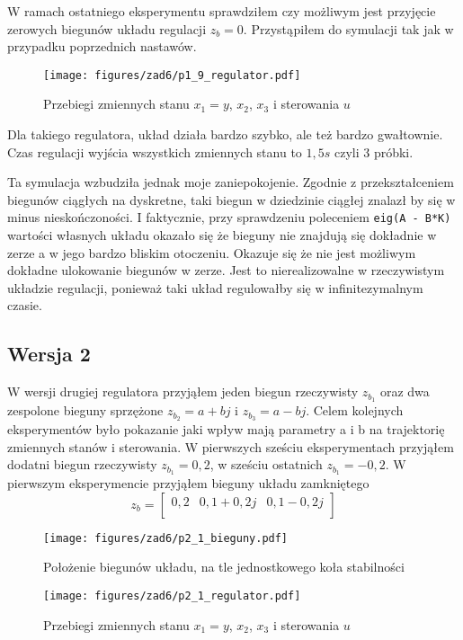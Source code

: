 \documentclass[a4paper,titlepage,11pt,floatssmall]{mwrep}
\begin{document}
W ramach ostatniego eksperymentu sprawdziłem czy możliwym jest przyjęcie zerowych biegunów układu regulacji $z_b = 0$.
Przystąpiłem do symulacji tak jak w przypadku poprzednich nastawów.

\begin{figure}[H]
\centering
\texttt{[image: figures/zad6/p1\_9\_regulator.pdf]}
\caption{Przebiegi zmiennych stanu $x_1 = y$, $x_2$, $x_3$ i sterowania $u$}
\end{figure}

\indent Dla takiego regulatora, układ działa bardzo szybko, ale też bardzo gwałtownie. Czas regulacji wyjścia wszystkich zmiennych stanu to $1,5s$ czyli 3 próbki.

\indent Ta symulacja wzbudziła jednak moje zaniepokojenie. Zgodnie z przekształceniem biegunów ciągłych na dyskretne, taki biegun w dziedzinie ciągłej znalazł by się w minus nieskończoności. I faktycznie, przy sprawdzeniu poleceniem \texttt{eig(A - B*K)} wartości własnych układu okazało się że bieguny nie znajdują się dokładnie w zerze a w jego bardzo bliskim otoczeniu. Okazuje się że nie jest możliwym dokładne ulokowanie biegunów w zerze. Jest to nierealizowalne w rzeczywistym układzie regulacji, ponieważ taki układ regulowałby się w infinitezymalnym czasie.

\subsection{Wersja 2}
W wersji drugiej regulatora przyjąłem jeden biegun rzeczywisty $z_{b_1}$ oraz dwa zespolone bieguny sprzężone $z_{b_2} = a + bj$ i $z_{b_3} = a - bj$. Celem kolejnych eksperymentów było pokazanie jaki wpływ mają parametry a i b na trajektorię zmiennych stanów i sterowania. W pierwszych sześciu eksperymentach przyjąłem dodatni biegun rzeczywisty $z_{b_1} = 0,2$, w sześciu ostatnich $z_{b_1} = -0,2$.
\newpage
\indent W pierwszym eksperymencie przyjąłem bieguny układu zamkniętego 
\[
z_b = 
\begin{bmatrix}
    0,2  &  0,1 + 0,2j  & 0,1 - 0,2j    \\     
\end{bmatrix}
\]

\begin{figure}[H]
\centering
\texttt{[image: figures/zad6/p2\_1\_bieguny.pdf]}
\caption{Położenie biegunów układu, na tle jednostkowego koła stabilności}
\end{figure} 

\begin{figure}[H]
\centering
\texttt{[image: figures/zad6/p2\_1\_regulator.pdf]}
\caption{Przebiegi zmiennych stanu $x_1 = y$, $x_2$, $x_3$ i sterowania $u$}
\end{figure}
\end{document}
